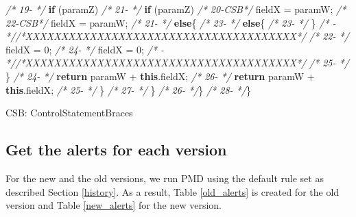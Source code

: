 \documentclass[
]{article}
\newenvironment{Shaded}{\begin{snugshade}}{\end{snugshade}}
\newcommand{\CommentTok}[1]{\textcolor[rgb]{0.56,0.35,0.01}{\textit{#1}}}
\newcommand{\DecValTok}[1]{\textcolor[rgb]{0.00,0.00,0.81}{#1}}
\newcommand{\FunctionTok}[1]{\textcolor[rgb]{0.00,0.00,0.00}{#1}}
\newcommand{\KeywordTok}[1]{\textcolor[rgb]{0.13,0.29,0.53}{\textbf{#1}}}
\newcommand{\NormalTok}[1]{#1}
\begin{document}
\begin{Shaded}
\begin{Highlighting}[]
\CommentTok{/* 19-   */}        \KeywordTok{if}\NormalTok{ (paramZ)                                      }\CommentTok{/* 21-   */}        \KeywordTok{if}\NormalTok{ (paramZ)                                      }
\CommentTok{/* 20-CSB*/}\NormalTok{            fieldX = paramW;                             }\CommentTok{/* 22-CSB*/}\NormalTok{            fieldX = paramW;                             }
\CommentTok{/* 21-   */}        \KeywordTok{else}\NormalTok{\{                                            }\CommentTok{/* 23-   */}        \KeywordTok{else}\NormalTok{\{                                            }
\CommentTok{/* 23-   */}\NormalTok{     \}                                                   }\CommentTok{/*   -   *//*XXXXXXXXXXXXXXXXXXXXXXXXXXXXXXXXXXXXXX*/}               
\CommentTok{/* 22-   */}\NormalTok{            fieldX = }\DecValTok{0}\NormalTok{;                                  }\CommentTok{/* 24-   */}\NormalTok{            fieldX = }\DecValTok{0}\NormalTok{;                                  }
\CommentTok{/*   -   *//*XXXXXXXXXXXXXXXXXXXXXXXXXXXXXXXXXXXXXX*/}               \CommentTok{/* 25-   */}\NormalTok{        \}                                                }
\CommentTok{/* 24-   */}        \KeywordTok{return}\NormalTok{ paramW + }\KeywordTok{this}\NormalTok{.}\FunctionTok{fieldX}\NormalTok{;                     }\CommentTok{/* 26-   */}        \KeywordTok{return}\NormalTok{ paramW + }\KeywordTok{this}\NormalTok{.}\FunctionTok{fieldX}\NormalTok{;                     }
\CommentTok{/* 25-   */}\NormalTok{     \}                                                   }\CommentTok{/* 27-   */}\NormalTok{     \}                                                   }
\CommentTok{/* 26-   */}\NormalTok{\}                                                        }\CommentTok{/* 28-   */}\NormalTok{\}                                                        }


\NormalTok{CSB: ControlStatementBraces}
\end{Highlighting}
\end{Shaded}

\normalsize

\subsection{Get the alerts for each version}

For the new and the old versions, we run PMD using the default rule set
as described Section \ref{history}. As a result, Table \ref{old_alerts} is created
for the old version and Table \ref{new_alerts} for the new version.
\end{document}
